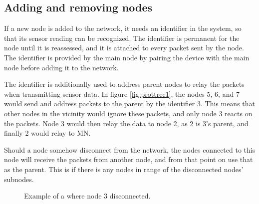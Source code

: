 \subsection*{Adding and removing nodes}
If a new node is added to the network, it needs an identifier in the system, so that its sensor reading can be recognized. The identifier is permanent for the node until it is reassessed, and it is attached to every packet sent by the node.
The identifier is provided by the main node by pairing the device with the main node before adding it to the network. 

The identifier is additionally used to address parent nodes to relay the packets when transmitting sensor data. In figure \ref{fig:prottree1}, the nodes 5, 6, and 7 would send and address packets to the parent by the identifier 3. This means that other nodes in the vicinity would ignore these packets, and only node 3 reacts on the packets. Node 3 would then relay the data to node 2, as 2 is 3's parent, and finally 2 would relay to MN.

Should a node somehow disconnect from the network, the nodes connected to this node will receive the packets from another node, and from that point on use that as the parent. This is  if there is any nodes in range of the disconnected nodes' subnodes. 

\begin{figure}[!h]
	\centering
	\caption{Example of a where node 3 disconnected.}
	\label{fig:prottree2}
\end{figure}

